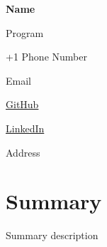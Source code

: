 \documentclass[a4paper,11pt]{article}
\newcommand{\name}{ Name } %
\newcommand{\course}{ Program } %
\newcommand{\phone}{  Phone Number  } %
\newcommand{\emaila}{  Email  } %
\newcommand{\address}{ Address } %
\newcommand{\github}{\url{ GitHub }}
\newcommand{\linkedIn}{\url{ LinkedIn }}
\begin{document}
    \selectfont

    \centering
    \textbf{\Large{\name}}

    \course

    \vspace*{2.5mm}
    +1 \phone

    \emaila
    \hspace*{1mm}

    \github
    \hspace*{1mm}

    \linkedIn
    \hspace*{1mm}

    \address

    \vspace{-3mm}


    \section{Summary}
    \vspace{1mm}
    Summary description


    
    \vspace{-5mm}
\end{document}
